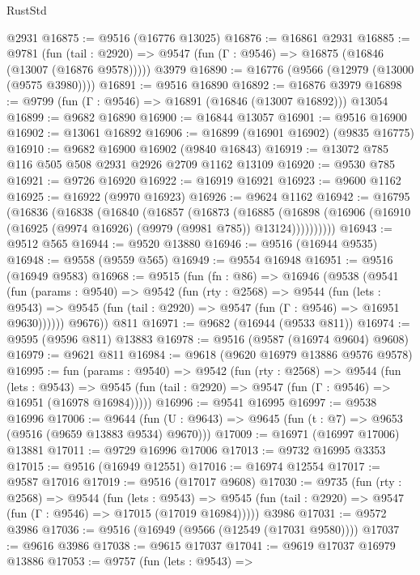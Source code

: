\begin{lexlean}{RustStd}
\begin{coremodule}
    @2931
@16875 := @9516 (@16776 @13025)
@16876 := @16861 @2931
@16885 := @9781
    (fun (tail : @2920) => @9547 (fun (Γ : @9546) => @16875 (@16846 (@13007 (@16876 @9578)))))
    @3979
@16890 := @16776 (@9566 (@12979 (@13000 (@9575 @3980))))
@16891 := @9516 @16890
@16892 := @16876 @3979
@16898 := @9799 (fun (Γ : @9546) => @16891 (@16846 (@13007 @16892))) @13054
@16899 := @9682 @16890
@16900 := @16844 @13057
@16901 := @9516 @16900
@16902 := @13061 @16892
@16906 := @16899 (@16901 @16902) (@9835 @16775)
@16910 := @9682 @16900 @16902 (@9840 @16843)
@16919 := @13072 @785 @116 @505 @508 @2931 @2926 @2709 @1162 @13109
@16920 := @9530 @785
@16921 := @9726 @16920
@16922 := @16919 @16921
@16923 := @9600 @1162
@16925 := @16922 (@9970 @16923)
@16926 := @9624 @1162
@16942 := @16795
    (@16836
      (@16838
        (@16840
          (@16857
            (@16873
              (@16885
                (@16898 (@16906 (@16910 (@16925 (@9974 @16926) (@9979 (@9981 @785)) @13124))))))))))
@16943 := @9512 @565
@16944 := @9520 @13880
@16946 := @9516 (@16944 @9535)
@16948 := @9558 (@9559 @565)
@16949 := @9554 @16948
@16951 := @9516 (@16949 @9583)
@16968 := @9515
    (fun (fn : @86) =>
    @16946
      (@9538
        (@9541
          (fun (params : @9540) =>
          @9542
            (fun (rty : @2568) =>
            @9544
              (fun (lets : @9543) =>
              @9545 (fun (tail : @2920) => @9547 (fun (Γ : @9546) => @16951 @9630))))))
        @9676))
    @811
@16971 := @9682 (@16944 (@9533 @811))
@16974 := @9595 (@9596 @811) @13883
@16978 := @9516 (@9587 (@16974 @9604) @9608)
@16979 := @9621 @811
@16984 := @9618 (@9620 @16979 @13886 @9576 @9578)
@16995 := fun (params : @9540) =>
  @9542
    (fun (rty : @2568) =>
    @9544
      (fun (lets : @9543) =>
      @9545 (fun (tail : @2920) => @9547 (fun (Γ : @9546) => @16951 (@16978 @16984)))))
@16996 := @9541 @16995
@16997 := @9538 @16996
@17006 := @9644
    (fun (U : @9643) => @9645 (fun (t : @7) => @9653 (@9516 (@9659 @13883 @9534) @9670)))
@17009 := @16971 (@16997 @17006) @13881
@17011 := @9729 @16996 @17006
@17013 := @9732 @16995 @3353
@17015 := @9516 (@16949 @12551)
@17016 := @16974 @12554
@17017 := @9587 @17016
@17019 := @9516 (@17017 @9608)
@17030 := @9735
    (fun (rty : @2568) =>
    @9544
      (fun (lets : @9543) =>
      @9545 (fun (tail : @2920) => @9547 (fun (Γ : @9546) => @17015 (@17019 @16984)))))
    @3986
@17031 := @9572 @3986
@17036 := @9516 (@16949 (@9566 (@12549 (@17031 @9580))))
@17037 := @9616 @3986
@17038 := @9615 @17037
@17041 := @9619 @17037 @16979 @13886
@17053 := @9757
    (fun (lets : @9543) =>

\end{coremodule}
\end{lexlean}
